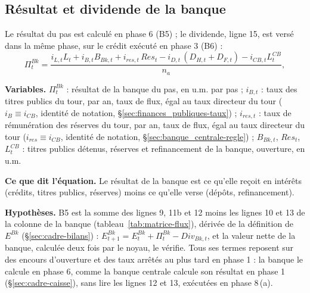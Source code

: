\documentclass[11pt,a4paper]{article}
\newcommand{\variables}{\par\noindent\textbf{Variables.} }
\newcommand{\sens}{\par\noindent\textbf{Ce que dit l'équation.} }
\newcommand{\hyp}{\par\noindent\textbf{Hypothèses.} }
\begin{document}
\subsection{Résultat et dividende de la banque}
\label{sec:banque-resultat}
\begin{proposee}
Le résultat du pas est calculé en phase 6 (B5) ; le dividende, ligne 15, est versé dans la même phase, sur le crédit exécuté en phase 3 (B6) :
\begin{equation}
\Pi^{\mathit{Bk}}_t = \frac{i_{L,t} L_t + i_{B,t} B_{\mathit{Bk},t} + i_{\mathit{res},t}\, \mathit{Res}_t - i_{D,t}\,(D_{H,t} + D_{F,t}) - i_{\mathit{CB},t} L^{\mathit{CB}}_t}{n_a} , \tag{B5}\label{eq:banque-resultat}
\end{equation}
\begin{lecture}
\variables $\Pi^{\mathit{Bk}}_t$ : résultat de la banque du pas, en u.m. par pas ; $i_{B,t}$ : taux des titres publics du tour, par an, taux de flux, égal au taux directeur du tour ($i_B \equiv i_{\mathit{CB}}$, identité de notation, \S\ref{sec:finances_publiques-taux}) ; $i_{\mathit{res},t}$ : taux de rémunération des réserves du tour, par an, taux de flux, égal au taux directeur du tour ($i_{\mathit{res}} \equiv i_{\mathit{CB}}$, identité de notation, \S\ref{sec:banque_centrale-regle}) ; $B_{\mathit{Bk},t}$, $\mathit{Res}_t$, $L^{\mathit{CB}}_t$ : titres publics détenus, réserves et refinancement de la banque, ouverture, en u.m.
\sens Le résultat de la banque est ce qu'elle reçoit en intérêts (crédits, titres publics, réserves) moins ce qu'elle verse (dépôts, refinancement).
\hyp B5 est la somme des lignes 9, 11b et 12 moins les lignes 10 et 13 de la colonne de la banque (tableau~\ref{tab:matrice-flux}), dérivée de la définition de $E^{\mathit{Bk}}$ (\S\ref{sec:cadre-bilans}) : $E^{\mathit{Bk}}_{t+1} = E^{\mathit{Bk}}_t + \Pi^{\mathit{Bk}}_t - \mathit{Div}_{\mathit{Bk},t}$, et la valeur nette de la banque, calculée deux fois par le noyau, le vérifie. Tous ses termes reposent sur des encours d'ouverture et des taux arrêtés au plus tard en phase 1 : la banque le calcule en phase 6, comme la banque centrale calcule son résultat en phase 1 (\S\ref{sec:cadre-caisse}), sans lire les lignes 12 et 13, exécutées en phase 8\,(a).

\end{lecture}
\end{proposee}
\end{document}
